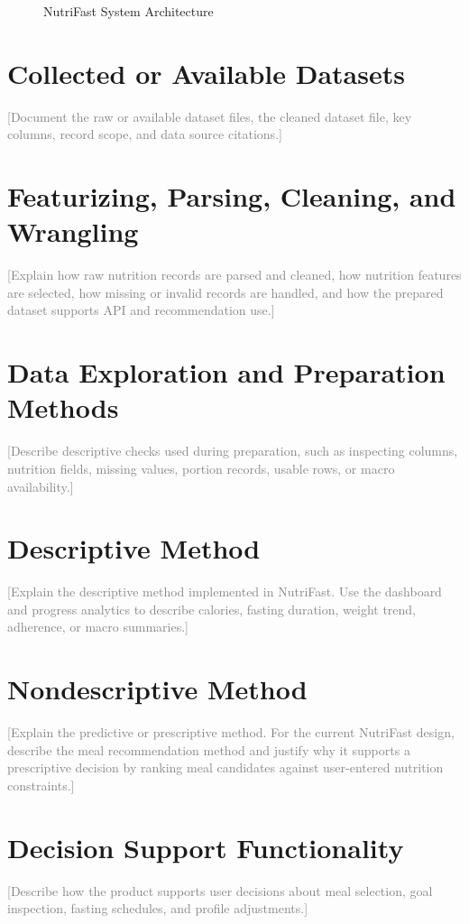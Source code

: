 \documentclass[12pt]{report}
\newcommand{\placeholder}[1]{\textcolor{gray}{[#1]}}
\begin{document}
\begin{figure}[H]
    \centering
    \caption{NutriFast System Architecture}
    \label{fig:architecture}
\end{figure}

\section{Collected or Available Datasets}
\placeholder{Document the raw or available dataset files, the cleaned dataset file, key columns, record scope, and data source citations.}

\section{Featurizing, Parsing, Cleaning, and Wrangling}
\placeholder{Explain how raw nutrition records are parsed and cleaned, how nutrition features are selected, how missing or invalid records are handled, and how the prepared dataset supports API and recommendation use.}

\section{Data Exploration and Preparation Methods}
\placeholder{Describe descriptive checks used during preparation, such as inspecting columns, nutrition fields, missing values, portion records, usable rows, or macro availability.}

\section{Descriptive Method}
\placeholder{Explain the descriptive method implemented in NutriFast. Use the dashboard and progress analytics to describe calories, fasting duration, weight trend, adherence, or macro summaries.}

\section{Nondescriptive Method}
\placeholder{Explain the predictive or prescriptive method. For the current NutriFast design, describe the meal recommendation method and justify why it supports a prescriptive decision by ranking meal candidates against user-entered nutrition constraints.}

\section{Decision Support Functionality}
\placeholder{Describe how the product supports user decisions about meal selection, goal inspection, fasting schedules, and profile adjustments.}
\end{document}

